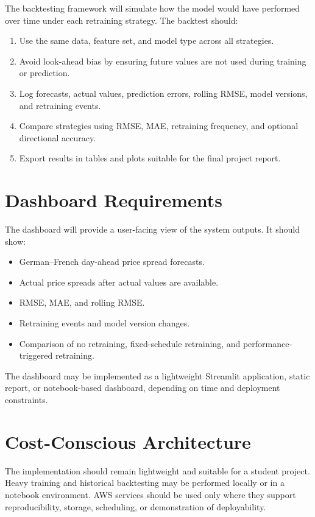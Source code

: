 \documentclass[12pt,a4paper]{article}
\begin{document}
The backtesting framework will simulate how the model would have performed over time under each retraining strategy. The backtest should:

\begin{enumerate}
    \item Use the same data, feature set, and model type across all strategies.
    \item Avoid look-ahead bias by ensuring future values are not used during training or prediction.
    \item Log forecasts, actual values, prediction errors, rolling RMSE, model versions, and retraining events.
    \item Compare strategies using RMSE, MAE, retraining frequency, and optional directional accuracy.
    \item Export results in tables and plots suitable for the final project report.
\end{enumerate}

\section{Dashboard Requirements}

The dashboard will provide a user-facing view of the system outputs. It should show:

\begin{itemize}
    \item German--French day-ahead price spread forecasts.
    \item Actual price spreads after actual values are available.
    \item RMSE, MAE, and rolling RMSE.
    \item Retraining events and model version changes.
    \item Comparison of no retraining, fixed-schedule retraining, and performance-triggered retraining.
\end{itemize}

The dashboard may be implemented as a lightweight Streamlit application, static report, or notebook-based dashboard, depending on time and deployment constraints.

\section{Cost-Conscious Architecture}

The implementation should remain lightweight and suitable for a student project. Heavy training and historical backtesting may be performed locally or in a notebook environment. AWS services should be used only where they support reproducibility, storage, scheduling, or demonstration of deployability.
\end{document}
